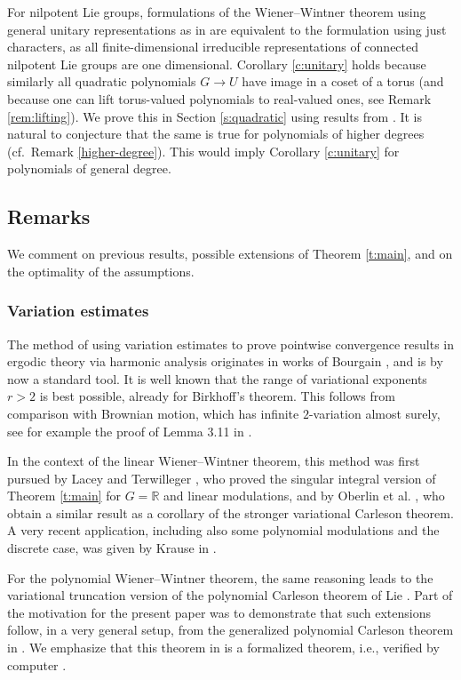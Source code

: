 \documentclass[12pt,reqno,a4paper,dvipsnames]{amsart}
\theoremstyle{plain}
\theoremstyle{definition}
\numberwithin{theorem}{section}
\numberwithin{equation}{section}
\newcommand{\R}{\mathbb{R}}
\begin{document}
For nilpotent Lie groups, formulations of the Wiener--Wintner theorem using general unitary representations as in \cite{ornstein-weiss, zk-return} are equivalent to the formulation using just characters, as all finite-dimensional irreducible representations of connected nilpotent Lie groups are one dimensional. Corollary \ref{c:unitary} holds because similarly all quadratic polynomials $G \to U$ have image in a coset of a torus (and because one can lift torus-valued polynomials to real-valued ones, see Remark \ref{rem:lifting}). We prove this in Section \ref{s:quadratic} using results from \cite{quadratic}. It is natural to conjecture that the same is true for polynomials of higher degrees (cf.~Remark \ref{higher-degree}). This would imply Corollary \ref{c:unitary} for polynomials of general degree.

\subsection{Remarks} We comment on previous results, possible extensions of Theorem \ref{t:main}, and on the optimality of the assumptions. 


\subsubsection{Variation estimates}
The method of using variation estimates to prove pointwise convergence results in ergodic theory via harmonic analysis originates in works of Bourgain \cite{Bourgain_arithmetic, bourgain}, and is by now a standard tool. It is well known that the range of variational exponents $r > 2$ is best possible, already for Birkhoff's theorem. This follows from comparison with Brownian motion, which has infinite $2$-variation almost surely, see for example the proof of Lemma 3.11 in \cite{Bourgain_arithmetic}.

In the context of the linear Wiener--Wintner theorem, this method was first pursued by Lacey and Terwilleger \cite{lacey-terwilleger}, who proved the singular integral version of Theorem \ref{t:main} for $G = \R$ and linear modulations, and by Oberlin et al. \cite[Appendix D]{oberlinetal}, who obtain a similar result as a corollary of the stronger variational Carleson theorem. A very recent application, including also some polynomial modulations and the discrete case, was given by Krause in \cite{krause2025}.

For the polynomial Wiener--Wintner theorem, the same reasoning leads to the variational truncation version of the polynomial Carleson theorem of Lie \cite{lie-quadratic, lie-polynomial}. Part of the motivation for the present paper was to demonstrate that such extensions follow, in a very general setup, from the generalized polynomial Carleson theorem in \cite{beckeretal}.
We emphasize that this theorem in \cite{beckeretal} is a formalized theorem, i.e., 
verified by computer \cite{becker2025blueprintformalizationcarlesonstheorem}.
\end{document}
